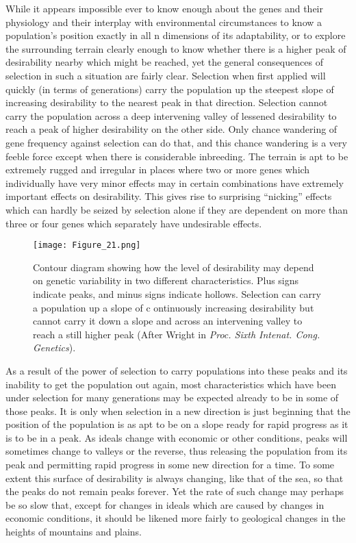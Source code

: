 While it appears impossible ever to know enough about the genes
and their physiology and their interplay with environmental circumstances
to know a population's position exactly in all n dimensions of its
adaptability, or to explore the surrounding terrain clearly enough to
know whether there is a higher peak of desirability nearby which might
be reached, yet the general consequences of selection in such a situation
are fairly clear. Selection when first applied will quickly (in terms of
generations) carry the population up the steepest slope of increasing
desirability to the nearest peak in that direction. Selection cannot carry
the population across a deep intervening valley of lessened desirability
to reach a peak of higher desirability on the other side. Only chance
wandering of gene frequency against selection can do that, and this
chance wandering is a very feeble force except when there is considerable
inbreeding. The terrain is apt to be extremely rugged and irregular
in places where two or more genes which individually have very
minor effects may in certain combinations have extremely important
effects on desirability. This gives rise to surprising ``nicking'' effects
which can hardly be seized by selection alone if they are dependent on
more than three or four genes which separately have undesirable effects.

\begin{figure}
	\centering
    \texttt{[image: Figure\_21.png]}
    \caption{Contour diagram showing how the level of desirability may depend on
			 genetic variability in two different characteristics. Plus signs indicate peaks, and
             minus signs indicate hollows. Selection can carry a population up a slope of c  ontinuously
             increasing desirability but cannot carry it down a slope and across an intervening
             valley to reach a still higher peak (After Wright in \textit{Proc. Sixth Intenat.
             Cong. Genetics}).}
    \label{fig:Lush_Figure_21}
\end{figure}

As a result of the power of selection to carry populations into these
peaks and its inability to get the population out again, most characteristics
which have been under selection for many generations may be
expected already to be in some of those peaks. It is only when selection
in a new direction is just beginning that the position of the population
is as apt to be on a slope ready for rapid progress as it is to be in a peak.
As ideals change with economic or other conditions, peaks will sometimes
change to valleys or the reverse, thus releasing the population
from its peak and permitting rapid progress in some new direction for a
time. To some extent this surface of desirability is always changing, like
that of the sea, so that the peaks do not remain peaks forever. Yet the
rate of such change may perhaps be so slow that, except for changes in
ideals which are caused by changes in economic conditions, it should be
likened more fairly to geological changes in the heights of mountains
and plains.

